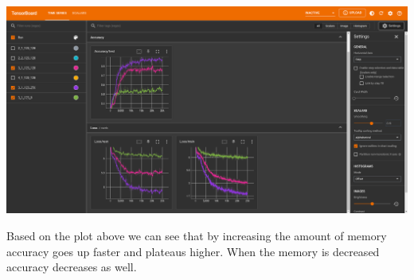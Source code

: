 \begin{answer}
	\begin{center}
		\includegraphics[width=1.0\textwidth]{HiddenState}
	\end{center}
	Based on the plot above we can see that by increasing the amount of memory accuracy goes up faster and plateaus higher. When the memory is decreased accuracy decreases as well.
  \end{answer}



